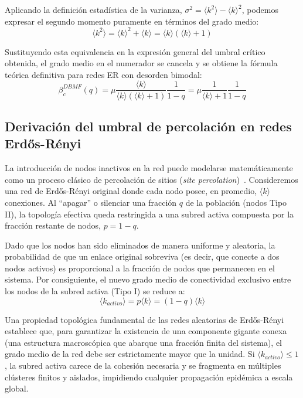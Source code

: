 \documentclass[%
reprint,
amsmath,amssymb,
aps,
]{revtex4-2}
\begin{document}
	Aplicando la definición estadística de la varianza, $\sigma^2 = \langle k^2 \rangle - \langle k \rangle^2$, podemos expresar el segundo momento puramente en términos del grado medio:
	\begin{equation}
		\langle k^2 \rangle = \langle k \rangle^2 + \langle k \rangle = \langle k \rangle (\langle k \rangle + 1)
	\end{equation}
	
	Sustituyendo esta equivalencia en la expresión general del umbral crítico obtenida, el grado medio en el numerador se cancela y se obtiene la fórmula teórica definitiva para redes ER con desorden bimodal:
	\begin{equation}
		\beta_c^{DBMF}(q) = \mu \frac{\langle k \rangle}{\langle k \rangle (\langle k \rangle + 1)} \frac{1}{1-q} = \mu \frac{1}{\langle k \rangle + 1} \frac{1}{1-q}
	\end{equation}
	
	\subsection{Derivación del umbral de percolación en redes Erdős-Rényi}
	\label{apendice:percolacion}
	
	La introducción de nodos inactivos en la red puede modelarse matemáticamente como un proceso clásico de percolación de sitios (\textit{site percolation})~\cite{Albert2002,Dorogovtsev2008}. Consideremos una red de Erdős-Rényi original donde cada nodo posee, en promedio, $\langle k \rangle$ conexiones. Al ``apagar'' o silenciar una fracción $q$ de la población (nodos Tipo II), la topología efectiva queda restringida a una subred activa compuesta por la fracción restante de nodos, $p = 1 - q$.
	
	Dado que los nodos han sido eliminados de manera uniforme y aleatoria, la probabilidad de que un enlace original sobreviva (es decir, que conecte a dos nodos activos) es proporcional a la fracción de nodos que permanecen en el sistema. Por consiguiente, el nuevo grado medio de conectividad exclusivo entre los nodos de la subred activa (Tipo I) se reduce a:
	\begin{equation}
		\langle k_{activo} \rangle = p \langle k \rangle = (1 - q) \langle k \rangle
	\end{equation}
	
	Una propiedad topológica fundamental de las redes aleatorias de Erdős-Rényi establece que, para garantizar la existencia de una componente gigante conexa (una estructura macroscópica que abarque una fracción finita del sistema), el grado medio de la red debe ser estrictamente mayor que la unidad. Si $\langle k_{activo} \rangle \le 1$, la subred activa carece de la cohesión necesaria y se fragmenta en múltiples clústeres finitos y aislados, impidiendo cualquier propagación epidémica a escala global.
	
\end{document}
